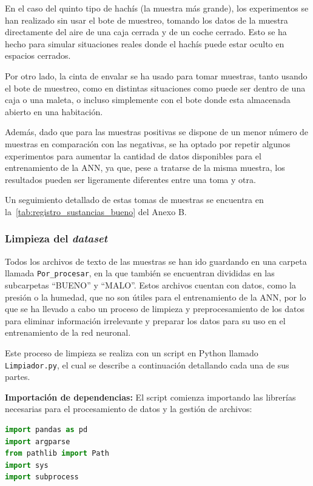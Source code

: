 En el caso del quinto tipo de hachís (la muestra más grande), los experimentos se han realizado sin usar el bote de muestreo, tomando los datos de la muestra directamente del aire de una caja cerrada y de un coche cerrado. Esto se ha hecho para simular situaciones reales donde el hachís puede estar oculto en espacios cerrados.
\par

Por otro lado, la cinta de envalar se ha usado para tomar muestras, tanto usando el bote de muestreo, como en distintas situaciones como puede ser dentro de una caja o una maleta, o incluso simplemente con el bote donde esta almacenada abierto en una habitación.
\par

Además, dado que para las muestras positivas se dispone de un menor número de muestras en comparación con las negativas, se ha optado por repetir algunos experimentos para aumentar la cantidad de datos disponibles para el entrenamiento de la ANN, ya que, pese a tratarse de la misma muestra, los resultados pueden ser ligeramente diferentes entre una toma y otra.

\newpage

Un seguimiento detallado de estas tomas de muestras se encuentra en la~\autoref{tab:registro_sustancias_bueno} del Anexo B.

\subsubsection{Limpieza del \textit{dataset}}
Todos los archivos de texto de las muestras se han ido guardando en una carpeta llamada \texttt{Por\_procesar}, en la que también se encuentran divididas en las subcarpetas ``BUENO'' y ``MALO''. Estos archivos cuentan con datos, como la presión o la humedad, que no son útiles para el entrenamiento de la ANN, por lo que se ha llevado a cabo un proceso de limpieza y preprocesamiento de los datos para eliminar información irrelevante y preparar los datos para su uso en el entrenamiento de la red neuronal.
\par

Este proceso de limpieza se realiza con un script en Python llamado \texttt{Limpiador.py}, el cual se describe a continuación detallando cada una de sus partes.

\textbf{Importación de dependencias:} El script comienza importando las librerías necesarias para el procesamiento de datos y la gestión de archivos:

\begin{lstlisting}[language=Python, caption={Importación de dependencias del script Limpiador.py.}, label={lst:limpiador_imports}]
import pandas as pd
import argparse
from pathlib import Path
import sys
import subprocess
\end{lstlisting}

